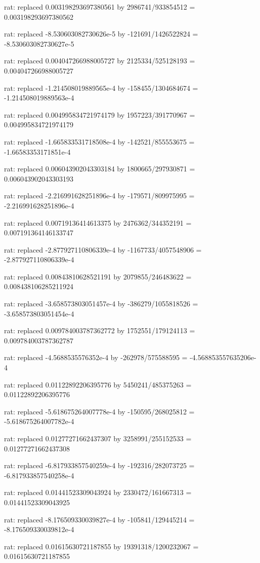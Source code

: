 \documentclass[a4paper,10pt]{article}
\begin{document}
\begin{eulernotebook}
\begin{eulercomment}
\begin{eulercomment}
\begin{eulercomment}
\begin{eulercomment}
\begin{eulercomment}
\begin{eulercomment}
\begin{eulercomment}
\begin{eulercomment}
\begin{eulercomment}
\begin{eulercomment}
\begin{eulercomment}
\begin{eulercomment}
\begin{eulercomment}
\begin{eulercomment}
\begin{eulercomment}
\begin{eulercomment}
\begin{euleroutput}
  rat: replaced 0.003198293697380561 by 2986741/933854512 = 0.003198293697380562
  
  rat: replaced -8.530603082730626e-5 by -121691/1426522824 = -8.530603082730627e-5
  
  rat: replaced 0.004047266988005727 by 2125334/525128193 = 0.004047266988005727
  
  rat: replaced -1.214508019889565e-4 by -158455/1304684674 = -1.214508019889563e-4
  
  rat: replaced 0.004995834721974179 by 1957223/391770967 = 0.004995834721974179
  
  rat: replaced -1.665833531718508e-4 by -142521/855553675 = -1.66583353171851e-4
  
  rat: replaced 0.006043902043303184 by 1800665/297930871 = 0.006043902043303193
  
  rat: replaced -2.216991628251896e-4 by -179571/809975995 = -2.216991628251896e-4
  
  rat: replaced 0.00719136414613375 by 2476362/344352191 = 0.007191364146133747
  
  rat: replaced -2.877927110806339e-4 by -1167733/4057548906 = -2.877927110806339e-4
  
  rat: replaced 0.00843810628521191 by 2079855/246483622 = 0.008438106285211924
  
  rat: replaced -3.658573803051457e-4 by -386279/1055818526 = -3.658573803051454e-4
  
  rat: replaced 0.009784003787362772 by 1752551/179124113 = 0.009784003787362787
  
  rat: replaced -4.5688535576352e-4 by -262978/575588595 = -4.568853557635206e-4
  
  rat: replaced 0.01122892206395776 by 5450241/485375263 = 0.01122892206395776
  
  rat: replaced -5.618675264007778e-4 by -150595/268025812 = -5.618675264007782e-4
  
  rat: replaced 0.01277271662437307 by 3258991/255152533 = 0.01277271662437308
  
  rat: replaced -6.817933857540259e-4 by -192316/282073725 = -6.817933857540258e-4
  
  rat: replaced 0.01441523309043924 by 2330472/161667313 = 0.01441523309043925
  
  rat: replaced -8.176509330039827e-4 by -105841/129445214 = -8.176509330039812e-4
  
  rat: replaced 0.01615630721187855 by 19391318/1200232067 = 0.01615630721187855
  

\end{euleroutput}
\end{eulercomment}
\end{eulercomment}
\end{eulercomment}
\end{eulercomment}
\end{eulercomment}
\end{eulercomment}
\end{eulercomment}
\end{eulercomment}
\end{eulercomment}
\end{eulercomment}
\end{eulercomment}
\end{eulercomment}
\end{eulercomment}
\end{eulercomment}
\end{eulercomment}
\end{eulercomment}
\end{eulernotebook}
\end{document}
